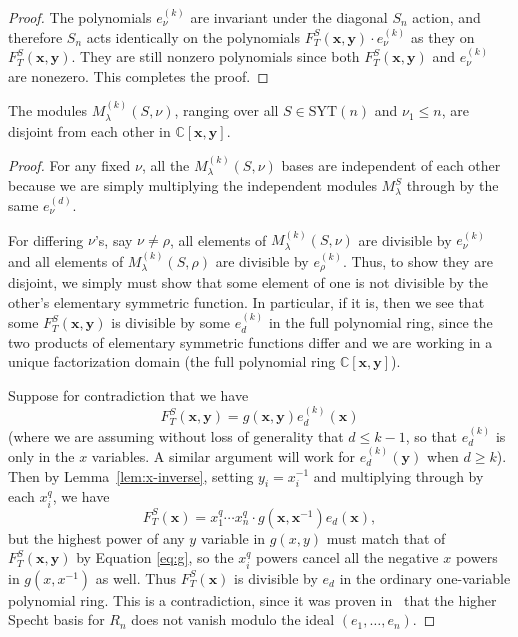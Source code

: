 \documentclass[ALCO,Unicode]{cedram}
\newcommand{\SYT}{\mathrm{SYT}}
\begin{document}
\begin{proof}
	The polynomials $e_\nu^{(k)}$ are invariant under the diagonal $S_n$ action, and therefore $S_n$ acts identically on the polynomials $F_T^S(\mathbf{x},\mathbf{y})\cdot e_\nu^{(k)}$ as they on $F_T^S(\mathbf{x},\mathbf{y})$.  They are still nonzero polynomials since both $F_T^S(\mathbf{x},\mathbf{y})$ and $e_\nu^{(k)}$ are nonezero.  This completes the proof.
\end{proof}

\begin{lemma}
	The modules $M^{(k)}_\lambda(S,\nu)$, ranging over all $S\in \SYT(n)$ and $\nu_1\le n$, are disjoint from each other in $\mathbb{C}[\mathbf{x},\mathbf{y}]$.
\end{lemma}

\begin{proof}
	For any fixed $\nu$, all the $M_\lambda^{(k)}(S,\nu)$ bases are independent of each other because we are simply multiplying the independent modules $M_\lambda^S$ through by the same $e_\nu^{(d)}$.  
	
	For differing $\nu$'s, say $\nu\neq \rho$, all elements of $M_\lambda^{(k)}(S,\nu)$ are divisible by $e_\nu^{(k)}$ and all elements of $M_\lambda^{(k)}(S,\rho)$ are divisible by $e_{\rho}^{(k)}$.  Thus, to show they are disjoint, we simply must show that some element of one is not divisible by the other's elementary symmetric function.  In particular, if it is, then we see that some $F_T^S(\mathbf{x},\mathbf{y})$ is divisible by some $e_d^{(k)}$ in the full polynomial ring, since the two products of elementary symmetric functions differ and we are working in a unique factorization domain (the full polynomial ring $\mathbb{C}[\mathbf{x},\mathbf{y}]$).
	
	Suppose for contradiction that we have \begin{equation}\label{eq:g}
	F_T^{S}(\mathbf{x},\mathbf{y})=g(\mathbf{x},\mathbf{y})e_d^{(k)}(\mathbf{x})
	\end{equation} (where we are assuming without loss of generality that $d\le k-1$, so that $e_d^{(k)}$ is only in the $x$ variables.  A similar argument will work for $e_d^{(k)}(\mathbf{y})$ when $d\ge k$).  Then by Lemma~\ref{lem:x-inverse}, setting $y_i=x_i^{-1}$ and multiplying through by each $x_i^q$, we have $$F_T^S(\mathbf{x})=x_1^q\cdots x_n^q \cdot g(\mathbf{x},\mathbf{x}^{-1})e_d(\mathbf{x}),$$ but the highest power of any $y$ variable in $g(x,y)$ must match that of $F_T^S(\mathbf{x},\mathbf{y})$ by Equation \eqref{eq:g}, so the $x_i^q$ powers cancel all the negative $x$ powers in $g(x,x^{-1})$ as well.  Thus $F_T^S(\mathbf{x})$ is divisible by $e_d$ in the ordinary one-variable polynomial ring.  This is a contradiction, since it was proven in~\cite{ATY} that the higher Specht basis for $R_n$ does not vanish modulo the ideal $(e_1,\ldots,e_n)$.  
\end{proof}
\end{document}
